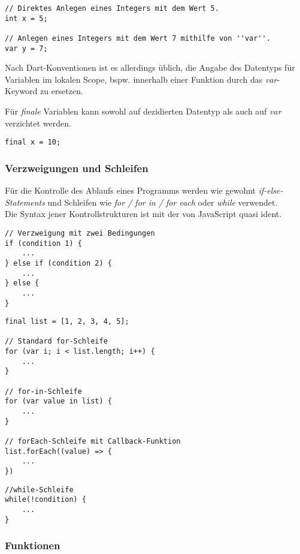 \begin{lstlisting}
// Direktes Anlegen eines Integers mit dem Wert 5.
int x = 5;

// Anlegen eines Integers mit dem Wert 7 mithilfe von ''var''.
var y = 7;
\end{lstlisting}

Nach Dart-Konventionen ist es allerdings üblich, die Angabe des Datentyps für Variablen 
im lokalen Scope, bspw. innerhalb einer Funktion durch das \textit{var}-Keyword zu ersetzen.

Für \textit{finale} Variablen kann sowohl auf dezidierten Datentyp als auch auf \textit{var} 
verzichtet werden.

\begin{lstlisting}
final x = 10;
\end{lstlisting}

\subsubsection{Verzweigungen und Schleifen}

Für die Kontrolle des Ablaufs eines Programms werden wie gewohnt \textit{if-else-Statements} und Schleifen
wie \textit{for / for in / for each} oder \textit{while} verwendet.\\
Die Syntax jener Kontrollstrukturen ist mit der von JavaScript quasi ident.

\begin{lstlisting}
// Verzweigung mit zwei Bedingungen
if (condition 1) {
    ...
} else if (condition 2) {
    ...
} else {
    ...
}
\end{lstlisting}

\begin{lstlisting}
final list = [1, 2, 3, 4, 5];

// Standard for-Schleife
for (var i; i < list.length; i++) {
    ...
}

// for-in-Schleife
for (var value in list) {
    ...
}

// forEach-Schleife mit Callback-Funktion
list.forEach((value) => {
    ...
})
\end{lstlisting}

\begin{lstlisting}
//while-Schleife
while(!condition) {
    ...
}
\end{lstlisting}

\subsubsection{Funktionen}

